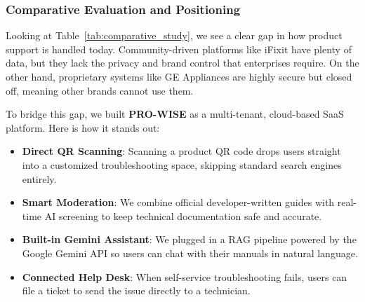 \documentclass[12pt,a4paper]{report}
\begin{document}
\begin{table}[H]
\centering
\caption{Comparative study of existing solutions}
\label{tab:comparative_study}
\end{table}

\subsubsection{Comparative Evaluation and Positioning}

Looking at Table~\ref{tab:comparative_study}, we see a clear gap in how product support is handled today. Community-driven platforms like iFixit have plenty of data, but they lack the privacy and brand control that enterprises require. On the other hand, proprietary systems like GE Appliances are highly secure but closed off, meaning other brands cannot use them. 

To bridge this gap, we built \textbf{PRO-WISE} as a multi-tenant, cloud-based SaaS platform. Here is how it stands out:
\begin{itemize}
    \item \textbf{Direct QR Scanning}: Scanning a product QR code drops users straight into a customized troubleshooting space, skipping standard search engines entirely.
    \item \textbf{Smart Moderation}: We combine official developer-written guides with real-time AI screening to keep technical documentation safe and accurate.
    \item \textbf{Built-in Gemini Assistant}: We plugged in a RAG pipeline powered by the Google Gemini API so users can chat with their manuals in natural language.
    \item \textbf{Connected Help Desk}: When self-service troubleshooting fails, users can file a ticket to send the issue directly to a technician.
\end{itemize}
\end{document}
